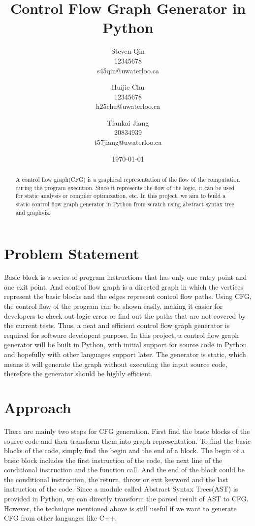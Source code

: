 \documentclass[11pt]{article}
\title{Control Flow Graph Generator in Python}
\author{Steven Qin\\12345678\\s45qin@uwaterloo.ca \and Huijie Chu\\12345678\\h25chu@uwaterloo.ca \and Tiankai Jiang\\20834939\\t57jiang@uwaterloo.ca}
\date{\today}
\begin{document}
\maketitle

\begin{abstract}
A control flow graph(CFG) is a graphical representation of the flow of the computation during the program execution. Since it represents the flow of the logic, it can be used for static analysis or compiler optimization, etc. In this project, we aim to build a static control flow graph generator in Python from scratch using abstract syntax tree and graphviz. 
\end{abstract}

\section{Problem Statement}\label{section-problemStatement}
Basic block is a series of program instructions that has only one entry point and one exit point. And control flow graph is a directed graph in which the vertices represent the basic blocks and the edges represent control flow paths. Using CFG, the control flow of the program can be shown easily, making it easier for developers to check out logic error or find out the paths that are not covered by the current tests. Thus, a neat and efficient control flow graph generator is required for software developent purpose. In this project, a control flow graph generator will be built in Python, with initial support for source code in Python and hopefully with other languages support later. The generator is static, which means it will generate the graph without executing the input source code, therefore the generator should be highly efficient.

\section{Approach}\label{section-approach}
There are mainly two steps for CFG generation. First find the basic blocks of the source code and then transform them into graph representation. To find the basic blocks of the code, simply find the begin and the end of a block. The begin of a basic block includes the first instruction of the code, the next line of the conditional instruction and the function call. And the end of the block could be the conditional instruction, the return, throw or exit keyword and the last instruction of the code. Since a module called Abstract Syntax Trees(AST) is provided in Python, we can directly transform the parsed result of AST to CFG. However, the technique mentioned above is still useful if we want to generate CFG from other languages like C++.
\end{document}
